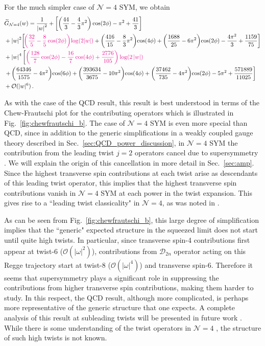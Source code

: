 \documentclass[letterpaper,11pt]{article}
\def\beq{\begin{equation}}
\def\eeq{\end{equation}}
\def\cD{\mathcal{D}}
\def\cN{\mathcal{N}}
\def\cO{\mathcal{O}}
\DeclareRobustCommand{\Sec}[1]{Sec.~\ref{#1}}
\DeclareRobustCommand{\Fig}[1]{Fig.~\ref{#1}}
\def\beq{\begin{equation}}
\def\eeq{\end{equation}}
\begin{document}
For the much simpler case of $\cN=4$ SYM, we obtain
\beq \label{eq:N=4_expansion}
\begin{split}
&\widetilde{G}_{\mathcal{N}=4}(w)=
\frac{1}{\left| w\right|^2}+\left[\left(\frac{44}{3} -\frac{4}{3} \pi ^2 \right)\cos (2 \phi )-\pi ^2+\frac{41}{3}\right]\\
&+\left| w\right| ^2\! \left[\! {\color{magenta}\left(\frac{32}{5}-\frac{8}{5}\cos (2 \phi )\right)\! \log (2\!  \left| w\right| )}
    +\left(\frac{416}{15} -\frac{8}{3} \pi ^2 \right)\! \cos (4 \phi )
   +\left(\frac{1688}{25} -6 \pi ^2\right)\! \cos (2 \phi)
  -\frac{4 \pi ^2}{3}+\frac{1159}{75}\right]\\
&+ \left| w\right| ^4 \left[{\color{magenta}\left(\frac{128}{7} \cos (2 \phi )-\frac{16}{7} \cos (4 \phi)+\frac{2776}{105}\right) \log (2 \left| w\right| )}\right.\\
&\left. +\left(\frac{64346}{1575}-4 \pi ^2\right)\! \cos (6 \phi )
+\left(\frac{393634}{3675}-10 \pi ^2\right)\! \cos (4 \phi )
+\left(\frac{37462}{735}-4 \pi ^2\right)\! \cos (2 \phi)
-5 \pi^2+\frac{571889}{11025}\right]\\
&+\cO(|w|^6)\,.
\end{split}
\eeq

As with the case of the QCD result, this result is best understood in terms of the Chew-Frautschi plot for the contributing operators which is illustrated in \Fig{fig:chewfrautschi_b}. The case of $\cN=4$ SYM is even more special than QCD, since in addition to the generic simplifications in a weakly coupled gauge theory described in  \Sec{sec:QCD_power_discussion}, in $\cN=4$ SYM the contribution from the leading twist $j=2$ operators cancel due to supersymmetry \cite{Chen:2020adz}. We will explain the origin of this cancellation in more detail in  \Sec{sec:amp}. Since the highest transverse spin contributions at each twist arise as descendants of this leading twist operator, this implies that the highest transverse spin contributions vanish in $\cN=4$ SYM at each power in the twist expansion.  This gives rise to a  ``leading twist classicality" in $\cN=4$, as was noted in \cite{Chen:2020adz}. 

As can be seen from \Fig{fig:chewfrautschi_b}, this large degree of simplification implies that the ``generic" expected structure in the squeezed limit does not start until quite high twists. In particular, since transverse spin-4 contributions first appear at twist-6 ($\cO(|\omega|^2)$), contributions from $\cD_{2n}$ operator acting on this Regge trajectory start at twist-8 ($\cO(|\omega|^4)$) and transverse spin-6. Therefore it seems that supersymmetry plays a significant role in suppressing the contributions from higher transverse spin contributions, making them harder to study. In this respect, the QCD result, although more complicated, is perhaps more representative of the generic structure that one expects. A complete analysis of this result at subleading twists will be presented in future work \cite{blocks:forthcoming}. While there is some understanding of the twist operators in $\cN=4$ \cite{Belitsky:2003sh,Belitsky:2004sc,Belitsky:2004yg,Belitsky:2005gr}, the structure of such high twists is not known. 
\end{document}
